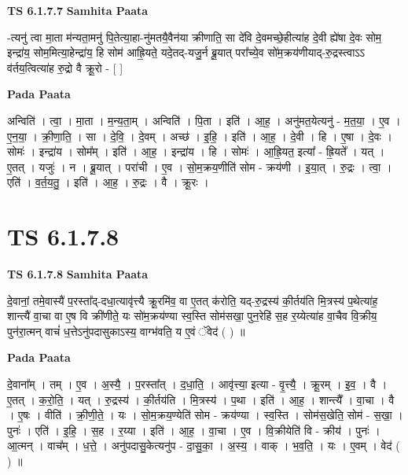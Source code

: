 \documentclass[17pt]{extarticle}
\begin{document}
\textbf{TS 6.1.7.7 } \newline
\textbf{Samhita Paata} \newline

-त्यनु॑ त्वा मा॒ता म॑न्यता॒मनु॑ पि॒तेत्या॒हा-नु॑मतयै॒वैन॑या क्रीणाति॒ सा दे॑वि दे॒वमच्छे॒हीत्या॑ह दे॒वी ह्ये॑षा दे॒वः सोम॒ इन्द्रा॑य॒ सोम॒मित्या॒हेन्द्रा॑य॒ हि सोम॑ आह्रि॒यते॒ यदे॒तद्-यजु॒र्न ब्रू॒यात् परा᳚च्ये॒व सो॑म॒क्रय॑णीयाद्-रु॒द्रस्त्वाऽऽ व॑र्तय॒त्वित्या॑ह रु॒द्रो वै क्रू॒रो - [  ] \newline

\textbf{Pada Paata} \newline

अन्विति॑ । त्वा॒ । मा॒ता । म॒न्य॒ता॒म् । अन्विति॑ । पि॒ता । इति॑ । आ॒ह॒ । अनु॑मत॒येत्यनु॑ - म॒त॒या॒ । ए॒व । ए॒न॒या॒ । क्री॒णा॒ति॒ । सा । दे॒वि॒ । दे॒वम् । अच्छ॑ । इ॒हि॒ । इति॑ । आ॒ह॒ । दे॒वी । हि । ए॒षा । दे॒वः । सोमः॑ । इन्द्रा॑य । सोम᳚म् । इति॑ । आ॒ह॒ । इन्द्रा॑य । हि । सोमः॑ । आ॒ह्रि॒यत॒ इत्या᳚ - ह्रि॒यते᳚ । यत् । ए॒तत् । यजुः॑ । न । ब्रू॒यात् । परा॑ची । ए॒व । सो॒म॒क्रय॒णीति॑ सोम - क्रय॑णी । इ॒या॒त् । रु॒द्रः । त्वा॒ । एति॑ । व॒र्त॒य॒तु॒ । इति॑ । आ॒ह॒ । रु॒द्रः । वै । क्रू॒रः ।  \newline




\section*{ TS 6.1.7.8 }

\textbf{TS 6.1.7.8 } \newline
\textbf{Samhita Paata} \newline

दे॒वानां॒ तमे॒वास्यै॑ प॒रस्ता᳚द्-दधा॒त्यावृ॑त्त्यै क्रू॒रमि॑व॒ वा ए॒तत् क॑रोति॒ यद्-रु॒द्रस्य॑ की॒र्तय॑ति मि॒त्रस्य॑ प॒थेत्या॑ह॒ शान्त्यै॑ वा॒चा वा ए॒ष वि क्री॑णीते॒ यः सो॑म॒क्रय॑ण्या स्व॒स्ति सोम॑सखा॒ पुन॒रेहि॑ स॒ह र॒य्येत्या॑ह वा॒चैव वि॒क्रीय॒ पुन॑रा॒त्मन् वाचं॑ ध॒त्तेऽनु॑पदासुकाऽस्य॒ वाग्भ॑वति॒ य ए॒वं ॅवेद॑ ( ) ॥ \newline

\textbf{Pada Paata} \newline

दे॒वाना᳚म् । तम् । ए॒व । अ॒स्यै॒ । प॒रस्ता᳚त् । द॒धा॒ति॒ । आवृ॑त्त्या॒ इत्या - वृ॒त्त्यै॒ । क्रू॒रम् । इ॒व॒ । वै । ए॒तत् । क॒रो॒ति॒ । यत् । रु॒द्रस्य॑ । की॒र्तय॑ति । मि॒त्रस्य॑ । प॒था । इति॑ । आ॒ह॒ । शान्त्यै᳚ । वा॒चा । वै । ए॒षः । वीति॑ । क्री॒णी॒ते॒ । यः । सो॒म॒क्रय॒ण्येति॑ सोम - क्रय॑ण्या । स्व॒स्ति । सोम॑स॒खेति॒ सोम॑ - स॒खा॒ । पुनः॑ । एति॑ । इ॒हि॒ । स॒ह । र॒य्या । इति॑ । आ॒ह॒ । वा॒चा । ए॒व । वि॒क्रीयेति॑ वि - क्रीय॑ । पुनः॑ । आ॒त्मन् । वाच᳚म् । ध॒त्ते॒ । अनु॑पदासु॒केत्यनु॑प - दा॒सु॒का॒ । अ॒स्य॒ । वाक् । भ॒व॒ति॒ । यः । ए॒वम् । वेद॑ ( ) ॥  \newline
\end{document}
